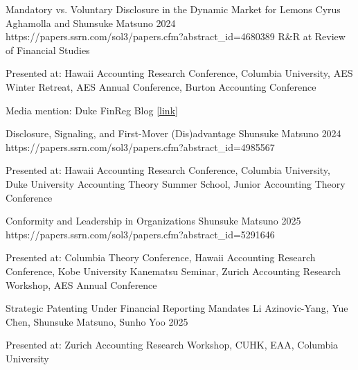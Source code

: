 \vspace{.3cm}

\paperentry
	{Mandatory vs. Voluntary Disclosure in the Dynamic Market for Lemons}   %
	{Cyrus Aghamolla and Shunsuke Matsuno}   %
	{2024}   %
	{https://papers.ssrn.com/sol3/papers.cfm?abstract_id=4680389}  %
	{}   %
	{R\&R at Review of Financial Studies}   %
	{
	\begin{cvitems}  %
		\item {Presented at: Hawaii Accounting Research Conference\co, Columbia University, AES Winter Retreat\co, AES Annual Conference, Burton Accounting Conference\co} 
		\item {Media mention: Duke FinReg Blog \href{https://sites.duke.edu/thefinregblog/2024/10/29/mandatory-vs-voluntary-disclosure-in-the-dynamic-market-for-lemons/}{[link]}}
	\end{cvitems}
	}
	{}

\paperentry
	{Disclosure, Signaling, and First-Mover (Dis)advantage}   %
	{Shunsuke Matsuno}   %
	{2024}
	{https://papers.ssrn.com/sol3/papers.cfm?abstract_id=4985567}  %
	{}   %
	{}   %
	{
	\begin{cvitems}  %
		\item {Presented at: Hawaii Accounting Research Conference, Columbia University, Duke University Accounting Theory Summer School, Junior Accounting Theory Conference}
	\end{cvitems}
	}
	{}

\paperentry
	{Conformity and Leadership in Organizations}
	{Shunsuke Matsuno}
	{2025}
	{https://papers.ssrn.com/sol3/papers.cfm?abstract_id=5291646}
	{}
	{}
	{
	\begin{cvitems} %
		\item {Presented at: Columbia Theory Conference, Hawaii Accounting Research Conference, Kobe University Kanematsu Seminar, Zurich Accounting Research Workshop, AES Annual Conference}
	\end{cvitems}
	}
	{}

\paperentry
	{Strategic Patenting Under Financial Reporting Mandates}
	{Li Azinovic-Yang, Yue Chen, Shunsuke Matsuno, Sunho Yoo}
	{2025}
	{}
	{}
	{}
	{
	\begin{cvitems} %
		\item {Presented at: Zurich Accounting Research Workshop\co, CUHK\co, EAA\co, Columbia University\co}
	\end{cvitems}
	}
	{}

